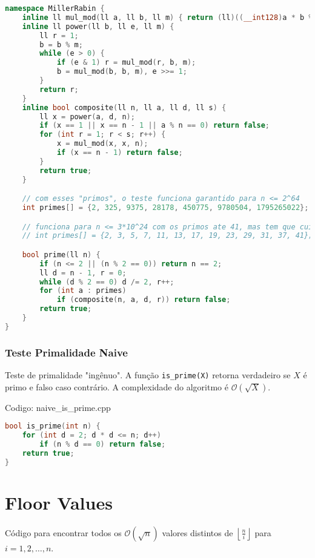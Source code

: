 \documentclass[10pt, a4paper, oneside]{book}
\begin{document}
\begin{lstlisting}[language=C++]
namespace MillerRabin {
    inline ll mul_mod(ll a, ll b, ll m) { return (ll)((__int128)a * b % m); }
    inline ll power(ll b, ll e, ll m) {
        ll r = 1;
        b = b % m;
        while (e > 0) {
            if (e & 1) r = mul_mod(r, b, m);
            b = mul_mod(b, b, m), e >>= 1;
        }
        return r;
    }
    inline bool composite(ll n, ll a, ll d, ll s) {
        ll x = power(a, d, n);
        if (x == 1 || x == n - 1 || a % n == 0) return false;
        for (int r = 1; r < s; r++) {
            x = mul_mod(x, x, n);
            if (x == n - 1) return false;
        }
        return true;
    }

    // com esses "primos", o teste funciona garantido para n <= 2^64
    int primes[] = {2, 325, 9375, 28178, 450775, 9780504, 1795265022};

    // funciona para n <= 3*10^24 com os primos ate 41, mas tem que cuidar com overflow
    // int primes[] = {2, 3, 5, 7, 11, 13, 17, 19, 23, 29, 31, 37, 41};

    bool prime(ll n) {
        if (n <= 2 || (n % 2 == 0)) return n == 2;
        ll d = n - 1, r = 0;
        while (d % 2 == 0) d /= 2, r++;
        for (int a : primes)
            if (composite(n, a, d, r)) return false;
        return true;
    }
}\end{lstlisting}
\hfill

\subsubsection{Teste Primalidade Naive}


Teste de primalidade "ingênuo". A função \texttt{is\_prime(X)} retorna verdadeiro se $X$ é primo e falso caso contrário. A complexidade do algoritmo é $\mathcal{O}(\sqrt{X})$.
\hfill

Codigo: naive\_is\_prime.cpp

\begin{lstlisting}[language=C++]
bool is_prime(int n) {
    for (int d = 2; d * d <= n; d++)
        if (n % d == 0) return false;
    return true;
}
\end{lstlisting}
\hfill

\section{Floor Values}


Código para encontrar todos os $\mathcal{O}(\sqrt{n})$ valores distintos de $\left\lfloor \frac{n}{i} \right\rfloor$ para $i = 1, 2, \ldots, n$.
\end{document}
